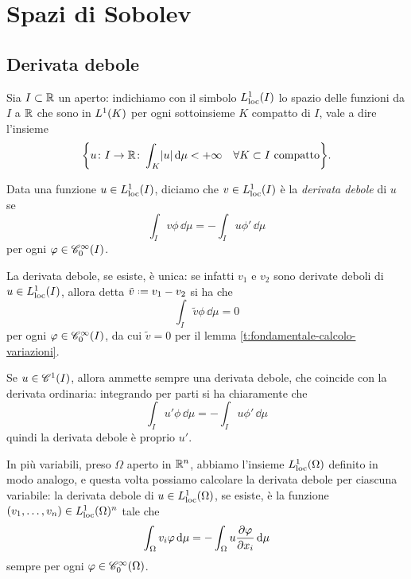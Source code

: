 \chapter{Spazi di Sobolev}
\label{ch:spazi-sobolev}

\section{Derivata debole}
\label{sec:derivata-debole}
Sia $I\subset\R$ un aperto: indichiamo con il simbolo $\locleb[1]{I}$ lo spazio delle funzioni da $I$ a $\R$ che sono in $\leb[1]{K}$ per ogni sottoinsieme $K$ compatto di $I$, vale a dire l'insieme
\begin{equation}
    \biggl\{u\colon I\to\R\colon \int_K\abs{u}\,\dd\mu<+\infty\quad\forall K\subset I\text{ compatto}\biggr\}.
\end{equation}
\begin{definizione} \label{d:derivata-debole}
    Data una funzione $u\in\locleb[1]{I}$, diciamo che $v\in\locleb[1]{I}$ è la \emph{derivata debole} di $u$ se
    \begin{equation}
        \int_I v\phi\,\dd\mu=-\int_I u\phi'\,\dd\mu
    \end{equation}
    per ogni $\phi\in\contsc[\infty]{I}$.
\end{definizione}
\begin{osservazione} \label{o:unicita-derivata-debole}
    La derivata debole, se esiste, è unica: se infatti $v_1$ e $v_2$ sono derivate deboli di $u\in\locleb[1]{I}$, allora detta $\tilde{v}\defeq v_1-v_2$ si ha che
    \begin{equation}
        \int_I \tilde{v}\phi\,\dd\mu=0
    \end{equation}
    per ogni $\phi\in\contsc[\infty]{I}$, da cui $\tilde{v}=0$ per il lemma \ref{t:fondamentale-calcolo-variazioni}.
\end{osservazione}
\begin{osservazione} \label{o:corrispondenza-derivata-debole}
    Se $u\in\cont[1]{I}$, allora ammette sempre una derivata debole, che coincide con la derivata ordinaria: integrando per parti si ha chiaramente che
    \begin{equation}
        \int_I u'\phi\,\dd\mu=-\int_I u\phi'\,\dd\mu
    \end{equation}
    quindi la derivata debole è proprio $u'$.
\end{osservazione}
In più variabili, preso $\Omega$ aperto in $\R^n$, abbiamo l'insieme $\locleb[1]{\Omega}$ definito in modo analogo, e questa volta possiamo calcolare la derivata debole per ciascuna variabile: la derivata debole di $u\in\locleb[1]{\Omega}$, se esiste, è la funzione $(v_1,\dotsc,v_n)\in\locleb[1]{\Omega}^n$ tale che
\begin{equation}
    \int_\Omega v_i\phi\,\dd\mu=-\int_\Omega u\drp{\phi}{x_i}\,\dd\mu
\end{equation}
sempre per ogni $\phi\in\contsc[\infty]{\Omega}$.

